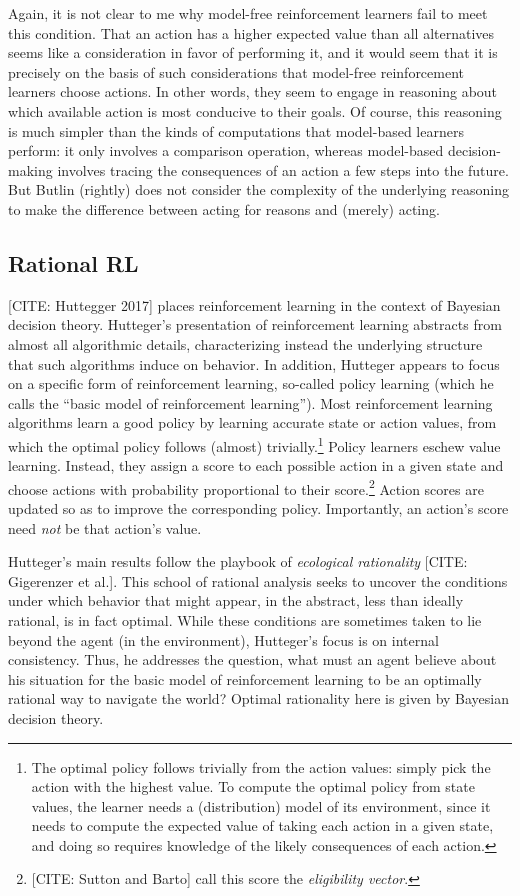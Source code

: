 Again, it is not clear to me why model-free reinforcement learners fail to meet this condition.
That an action has a higher expected value than all alternatives seems like a consideration in favor of performing it, and it would seem that it is precisely on the basis of such considerations that model-free reinforcement learners choose actions.
In other words, they seem to engage in reasoning about which available action is most conducive to their goals.
Of course, this reasoning is much simpler than the kinds of computations that model-based learners perform: it only involves a comparison operation, whereas model-based decision-making involves tracing the consequences of an action a few steps into the future.
But Butlin (rightly) does not consider the complexity of the underlying reasoning to make the difference between acting for reasons and (merely) acting.

\subsection{Rational RL}

[CITE: Huttegger 2017] places reinforcement learning in the context of Bayesian decision theory. 
Hutteger's presentation of reinforcement learning abstracts from almost all algorithmic details, characterizing instead the underlying structure that such algorithms induce on behavior.
In addition, Hutteger appears to focus on a specific form of reinforcement learning, so-called policy learning (which he calls the ``basic model of reinforcement learning'').
Most reinforcement learning algorithms learn a good policy by learning accurate state or action values, from which the optimal policy follows (almost) trivially.\footnote{The optimal policy follows trivially from the action values: simply pick the action with the highest value. To compute the optimal policy from state values, the learner needs a (distribution) model of its environment, since it needs to compute the expected value of taking each action in a given state, and doing so requires knowledge of the likely consequences of each action.}
Policy learners eschew value learning.
Instead, they assign a score to each possible action in a given state and choose actions with probability proportional to their score.\footnote{[CITE: Sutton and Barto] call this score the \emph{eligibility vector}.}
Action scores are updated so as to improve the corresponding policy.
Importantly, an action's score need \emph{not} be that action's value.

Hutteger's main results follow the playbook of \emph{ecological rationality} [CITE: Gigerenzer et al.].
This school of rational analysis seeks to uncover the conditions under which behavior that might appear, in the abstract, less than ideally rational, is in fact optimal. 
While these conditions are sometimes taken to lie beyond the agent (in the environment), Hutteger's focus is on internal consistency.
Thus, he addresses the question, what must an agent believe about his situation for the basic model of reinforcement learning to be an optimally rational way to navigate the world?
Optimal rationality here is given by Bayesian decision theory.

